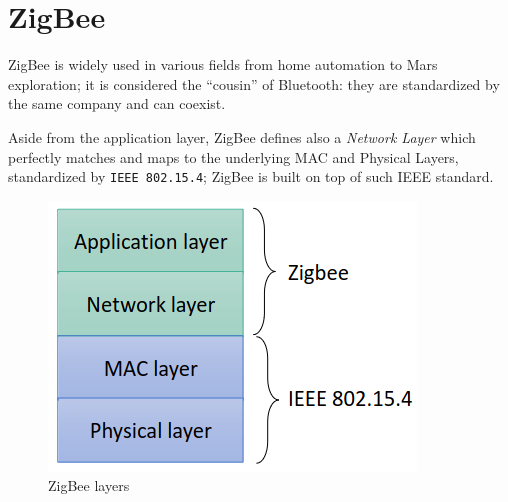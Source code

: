 \chapter{ZigBee}

ZigBee is widely used in various fields from home automation to Mars exploration; it is considered the ``cousin'' of Bluetooth: they are standardized by the same company and can coexist.

\begin{paracol}{2}

   \colfill
   Aside from the application layer, ZigBee defines also a \textit{Network Layer} which perfectly matches and maps to the underlying MAC and Physical Layers, standardized by \texttt{IEEE 802.15.4};
   ZigBee is built on top of such IEEE standard.
   \colfill

   \switchcolumn
   
   \begin{figure}[htbp]
      \centering
      \includegraphics{images/zigbee_layers.png}
      \caption{ZigBee layers}
      \label{fig:zigbee_layers}
   \end{figure}
\end{paracol}


